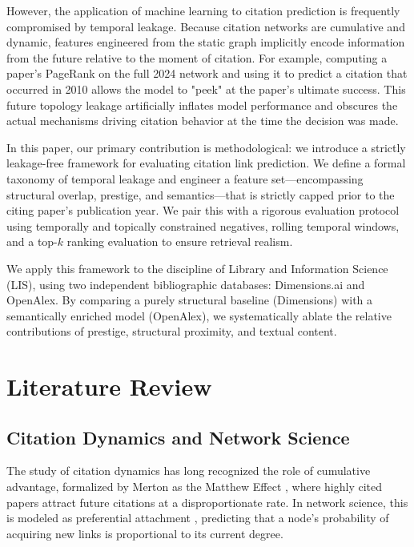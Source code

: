 \documentclass[11pt,a4paper]{article}
\begin{document}
However, the application of machine learning to citation prediction is frequently compromised by temporal leakage. Because citation networks are cumulative and dynamic, features engineered from the static graph implicitly encode information from the future relative to the moment of citation. For example, computing a paper's PageRank on the full 2024 network and using it to predict a citation that occurred in 2010 allows the model to "peek" at the paper's ultimate success. This future topology leakage artificially inflates model performance and obscures the actual mechanisms driving citation behavior at the time the decision was made.

In this paper, our primary contribution is methodological: we introduce a strictly leakage-free framework for evaluating citation link prediction. We define a formal taxonomy of temporal leakage and engineer a feature set---encompassing structural overlap, prestige, and semantics---that is strictly capped prior to the citing paper's publication year. We pair this with a rigorous evaluation protocol using temporally and topically constrained negatives, rolling temporal windows, and a top-$k$ ranking evaluation to ensure retrieval realism.

We apply this framework to the discipline of Library and Information Science (LIS), using two independent bibliographic databases: Dimensions.ai and OpenAlex. By comparing a purely structural baseline (Dimensions) with a semantically enriched model (OpenAlex), we systematically ablate the relative contributions of prestige, structural proximity, and textual content. 

\section{Literature Review}
\label{sec:lit}

\subsection{Citation Dynamics and Network Science}
The study of citation dynamics has long recognized the role of cumulative advantage, formalized by Merton as the Matthew Effect \citep{merton1968matthew}, where highly cited papers attract future citations at a disproportionate rate. In network science, this is modeled as preferential attachment \citep{barabasi1999emergence}, predicting that a node's probability of acquiring new links is proportional to its current degree. 
\end{document}
